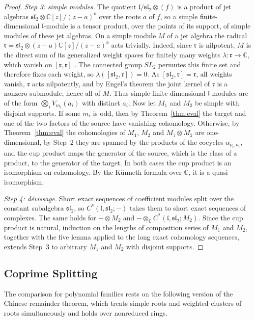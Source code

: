 \documentclass[11pt]{amsart}
\numberwithin{equation}{section}
\theoremstyle{definition}
\theoremstyle{remark}
\newcommand{\C}{\mathbb{C}}
\newcommand{\sltwo}{\mathfrak{sl}_2}
\newcommand{\lie}{\mathfrak{l}}
\begin{document}
\begin{proof}
\emph{Step 3: simple modules.} The quotient $\lie/\sltwo\otimes(f)$ is a product of jet algebras $\sltwo\otimes\C[z]/(z-a)^k$ over the roots $a$ of $f$, so a simple finite-dimensional $\lie$-module is a tensor product, over the points of its support, of simple modules of these jet algebras. On a simple module $M$ of a jet algebra the radical $\mathfrak r=\sltwo\otimes(z-a)\C[z]/(z-a)^k$ acts trivially. Indeed, since $\mathfrak r$ is nilpotent, $M$ is the direct sum of its generalized weight spaces for finitely many weights $\lambda:\mathfrak r\to\C$, which vanish on $[\mathfrak r,\mathfrak r]$ \cite[Chapter~II]{Jac62}. The connected group $SL_2$ permutes this finite set and therefore fixes each weight, so $\lambda([\sltwo,\mathfrak r])=0$. As $[\sltwo,\mathfrak r]=\mathfrak r$, all weights vanish, $\mathfrak r$ acts nilpotently, and by Engel's theorem the joint kernel of $\mathfrak r$ is a nonzero submodule, hence all of $M$. Thus simple finite-dimensional $\lie$-modules are of the form $\bigotimes_iV_{m_i}(a_i)$ with distinct $a_i$. Now let $M_1$ and $M_2$ be simple with disjoint supports. If some $m_i$ is odd, then by Theorem~\ref{thm:eval} the target and one of the two factors of the source have vanishing cohomology. Otherwise, by Theorem~\ref{thm:eval} the cohomologies of $M_1$, $M_2$ and $M_1\otimes M_2$ are one-dimensional, by Step~2 they are spanned by the products of the cocycles $\alpha_{p_i,a_i}$, and the cup product maps the generator of the source, which is the class of a product, to the generator of the target. In both cases the cup product is an isomorphism on cohomology. By the K\"unneth formula over $\C$, it is a quasi-isomorphism.

\emph{Step 4: d\'evissage.} Short exact sequences of coefficient modules split over the constant subalgebra $\sltwo$, so $C^*(\lie,\sltwo;-)$ takes them to short exact sequences of complexes. The same holds for $-\otimes M_2$ and $-\otimes_\C C^*(\lie,\sltwo;M_2)$. Since the cup product is natural, induction on the lengths of composition series of $M_1$ and $M_2$, together with the five lemma applied to the long exact cohomology sequences, extends Step~3 to arbitrary $M_1$ and $M_2$ with disjoint supports.
\end{proof}

\subsection{Coprime Splitting}
The comparison for polynomial families rests on the following version of the Chinese remainder theorem, which treats simple roots and weighted clusters of roots simultaneously and holds over nonreduced rings.
\end{document}
